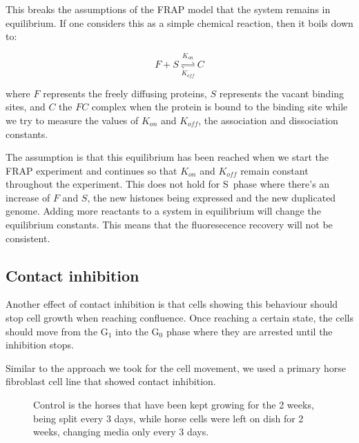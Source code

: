   This breaks the assumptions of the FRAP model that the system remains in equilibrium. If one
  considers this as a simple chemical reaction, then it boils down to:
    
  \begin{displaymath}
    F + S \overset{K_{on}}{\underset{K_{off}}{\rightleftharpoons}} C
  \end{displaymath}
  
  where $F$ represents the freely diffusing proteins, $S$ represents the vacant binding sites, and
  $C$ the $FC$ complex when the protein is bound to the binding site while we try to measure the
  values of $K_{on}$ and $K_{off}$, the association and dissociation constants.
  
  The assumption is that this equilibrium has been reached when we start the FRAP experiment and
  continues so that $K_{on}$ and $K_{off}$ remain constant throughout the experiment. This does
  not hold for S~phase where there's an increase of $F$ and $S$, the new histones being expressed
  and the new duplicated genome. Adding more reactants to a system in equilibrium will change the equilibrium
  constants. This means that the fluoresecence recovery will not be consistent.
  
  \subsection{Contact inhibition}
    
    Another effect of contact inhibition is that cells showing this behaviour should stop cell
    growth when reaching confluence. Once reaching a certain state, the cells should move from
    the G$_1$ into the G$_0$ phase where they are arrested until the inhibition stops.
    
    Similar to the approach we took for the cell movement, we used a primary horse fibroblast
    cell line that showed contact inhibition.
    
    \begin{figure}
      \centering
                   {Control is the horses that have been kept growing for the 2 weeks,
                    being split every 3 days, while horse cells were left on dish for
                    2 weeks, changing media only every 3 days.}
      \label{fig:horse-facs}
    \end{figure}
    
